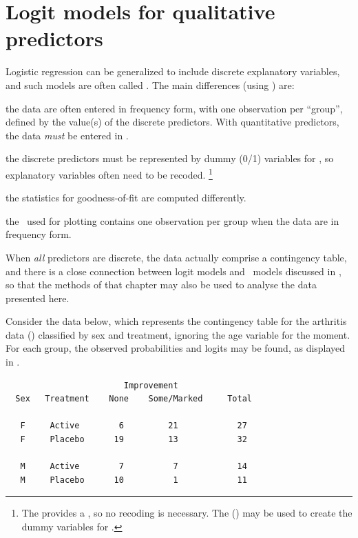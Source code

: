 \section{Logit models for qualitative predictors}\label{sec:logist-qual}

Logistic regression can be generalized to include discrete
explanatory variables, and such models are often called
.
The main differences (using ) are:

\begin{itemize*}
\item the data are often entered in frequency form, with one observation
       per ``group'', defined by the value(s) of the discrete predictors.
		 With quantitative predictors, the data \emph{must} be entered in
		 .
\item the discrete predictors must be represented by dummy (0/1) variables
for ,
so explanatory variables often need to be recoded.%
\footnote{The  provides a , so no
recoding is necessary. The  () may be used
to create the dummy variables for .}
\item the statistics for goodness-of-fit are computed differently.

\item the \ODS\ used for plotting contains one observation
 per group when the data are in frequency form.
\end{itemize*}

When \emph{all} predictors are discrete, the data actually comprise
a contingency table, and there is a close connection between logit
models and \loglin\ models discussed in ,
so that the methods of that chapter may also be used to analyse the data
presented here. 

Consider the data below, which represents the contingency table for
the arthritis data ()
classified by sex and treatment, ignoring the age variable for the moment.  For each group, the observed probabilities and logits
may be found, as displayed in .
\begin{verbatim}
                        Improvement
  Sex   Treatment    None    Some/Marked     Total

   F     Active        6         21            27
   F     Placebo      19         13            32

   M     Active        7          7            14
   M     Placebo      10          1            11
\end{verbatim}


